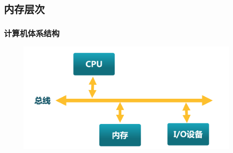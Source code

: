 \subsection{内存层次} %

\begin{frame}[plain,t]
    
    \frametitle{计算机体系结构}
    \begin{figure}
        \centering
        \includegraphics[width=0.7\linewidth]{arch1}
    \end{figure}
    
\end{frame}


